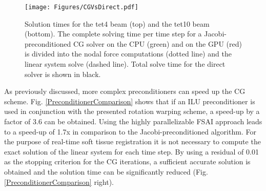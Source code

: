 \begin{figure}[htbp]
   \centering   
   \texttt{[image: Figures/CGVsDirect.pdf]}     
\caption{Solution times for the tet4 beam (top) and the tet10 beam (bottom). The complete solving time per time step for a Jacobi-preconditioned CG solver on the CPU (green) and on the GPU (red) is divided into the nodal force computations (dotted line) and the linear system solve (dashed line). Total solve time for the direct solver is shown in black.}
\label{CGVsDirect}
\end{figure}

As previously discussed, more complex preconditioners can speed up the CG scheme. Fig. \ref{PreconditionerComparison} shows that if an ILU preconditioner is used in conjunction with the presented rotation warping scheme, a speed-up by a factor of 3.6 can be obtained. Using the highly parallelizable FSAI approach leads to a speed-up of 1.7x in comparison to the Jacobi-preconditioned algorithm. For the purpose of real-time soft tissue registration it is not necessary to compute the exact solution of the linear system for each time step. By using a residual of 0.01 as the stopping criterion for the CG iterations, a sufficient accurate solution is obtained and the solution time can be significantly reduced (Fig. \ref{PreconditionerComparison} right). 

